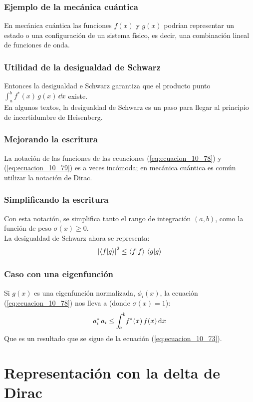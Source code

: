 \documentclass[12pt]{beamer}
\begin{document}
\begin{frame}
\frametitle{Ejemplo de la mecánica cuántica}
En mecánica cuántica las funciones $f (x)$ y $g (x)$ podrían representar un estado o una configuración de un sistema físico, es decir, una combinación lineal de funciones de onda.
\end{frame}
\begin{frame}
\frametitle{Utilidad de la desigualdad de Schwarz}
Entonces la desigualdad e Schwarz garantiza que el producto punto $\displaystyle \int_{a}^{b} f^{*} (x) \, g(x) \, \dd{x}$ existe.
\\
\bigskip
\pause
En algunos textos, la desigualdad de Schwarz es un paso para llegar al principio de incertidumbre de Heisenberg.
\end{frame}
\begin{frame}
\frametitle{Mejorando la escritura}
La notación de las funciones de las ecuaciones (\ref{eq:ecuacion_10_78}) y (\ref{eq:ecuacion_10_79}) es a veces incómoda; \pause en mecánica cuántica es común utilizar la notación de Dirac.
\end{frame}
\begin{frame}
\frametitle{Simplificando la escritura}
Con esta notación, se simplifica tanto el rango de integración $(a, b)$, como la función de peso $\sigma (x) \geq 0$. 
\\
\bigskip
\pause
La desigualdad de Schwarz ahora se representa:
\pause
\begin{align}
\abs{\braket{f}{g}}^{2} \leq \braket{f}{f} \, \braket{g}{g}
\label{eq:ecuacion_10_78a}
\end{align}
\end{frame}
\begin{frame}
\frametitle{Caso con una eigenfunción}
Si $g (x)$ es una eigenfunción normalizada, $\phi_{i} (x)$, la ecuación (\ref{eq:ecuacion_10_78}) nos lleva a (donde $\sigma (x) = 1$):
\pause
\begin{align}
a_{i}^{*} \, a_{i} \leq \scaleint{5ex}_{\bs a}^{b} f^{*} (x) \, f (x) \dd{x} 
\label{eq:ecuacion_10_81}
\end{align}
Que es un resultado que se sigue de la ecuación (\ref{eq:ecuacion_10_73}).
\end{frame}


\section{Representación con la delta de Dirac}
\end{document}

